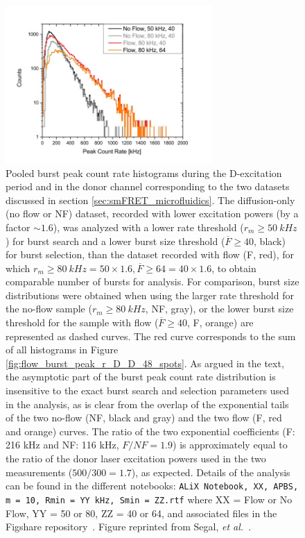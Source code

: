 \begin{figure}
\centering
\includegraphics[width=0.7\textwidth]{chapters/figures/pooled_burst_peak_r_D_D.jpg}
\caption{\label{fig:pooled_burst_peak_r_D_D}
Pooled burst peak count rate histograms during the D-excitation period and in the donor channel corresponding to the two datasets discussed in section \ref{sec:smFRET_microfluidics}.
The diffusion-only (no flow or NF) dataset, recorded with lower excitation powers (by a factor $\sim1.6$), was analyzed with a lower rate threshold ($r_m \geq 50~kHz$) for burst search and a lower burst size threshold ($\overline{F} \geq 40$, black) for burst selection, than the dataset recorded with flow (F, red), for which $r_m \geq 80~kHz = 50 \times 1.6, \overline{F} \geq 64 = 40 \times 1.6$, to obtain comparable number of bursts for analysis.
For comparison, burst size distributions were obtained when using the larger rate threshold for the no-flow sample  ($r_m \geq 80~kHz$, NF, gray), or the lower burst size threshold for the sample with flow ($\overline{F} \geq 40$, F, orange) are represented as dashed curves. 
The red curve corresponds to the sum of all histograms in
Figure \ref{fig:flow_burst_peak_r_D_D_48_spots}.
As argued in the text, the asymptotic part of the burst peak count rate distribution is insensitive to the exact burst search and selection parameters used in the analysis, as is clear from the overlap of the exponential tails of the two no-flow (NF, black and gray) and the two flow (F, red and orange) curves.
The ratio of the two exponential coefficients (F: 216 kHz and NF: 116 kHz, $F/NF = 1.9$) is approximately equal to the ratio of the donor laser  excitation powers used in the two measurements ($500/300 = 1.7$), as expected.
Details of the analysis can be found in the different notebooks:
\texttt{ALiX Notebook, XX, \ac{APBS}, m = 10, Rmin = YY kHz, Smin = ZZ.rtf} where XX = Flow or No Flow, YY = 50 or 80, ZZ = 40 or 64, and associated files in the Figshare repository~\cite{figshare_repo_2019}.
Figure reprinted from Segal, \textit{et al.}~\cite{segal_methods_2019}.
}
\end{figure}

